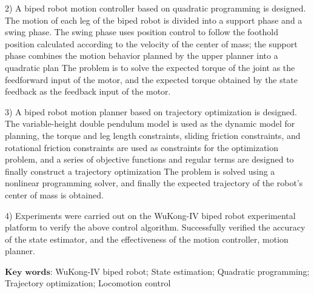 2) A biped robot motion controller based on quadratic programming is designed. The motion of each leg of the biped robot is divided into a support phase and a swing phase. 
The swing phase uses position control to follow the foothold position calculated according to the velocity of the center of mass; the support phase combines the motion behavior 
planned by the upper planner into a quadratic plan The problem is to solve the expected torque of the joint as the feedforward input of the motor, and the expected torque 
obtained by the state feedback as the feedback input of the motor.

3) A biped robot motion planner based on trajectory optimization is designed. The variable-height double pendulum model is used as the dynamic model for planning, 
the torque and leg length constraints, sliding friction constraints, and rotational friction constraints are used as constraints for the optimization problem, 
and a series of objective functions and regular terms are designed to finally construct a trajectory optimization The problem is solved using a nonlinear programming 
solver, and finally the expected trajectory of the robot's center of mass is obtained.

4) Experiments were carried out on the WuKong-IV biped robot experimental platform to verify the above control algorithm. 
Successfully verified the accuracy of the state estimator, and the effectiveness of the motion controller, motion planner.

$\textbf{Key words}$: WuKong-IV biped robot; State estimation; Quadratic programming; Trajectory optimization; Locomotion control